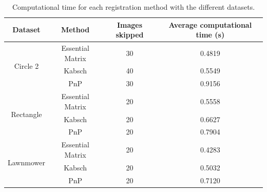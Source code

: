 \documentclass[12pt,a4paper]{article}
\begin{document}
    \begin{table}[t!]
      \centering{}
      \hspace*{-1.5cm}\begin{tabular}{|c|c|c|c|}
      \hline
      \textbf{Dataset} &\textbf{Method}  & \textbf{Images skipped} & {\textbf{Average computational time (s)}} \\ 
      \hline
      \multirow{3}{*}{Circle 2} & Essential Matrix & 30 & 0.4819 \\
                                \cline{2-4}
                                & Kabsch & 40 & 0.5549 \\
                                \cline{2-4}
                                & PnP & 30 & 0.9156 \\
      \hline
      \multirow{3}{*}{Rectangle} & Essential Matrix & 20 & 0.5558 \\
                                \cline{2-4}
                                & Kabsch & 20 & 0.6627 \\
                                \cline{2-4}
                                & PnP & 20 & 0.7904 \\
      \hline
      \multirow{3}{*}{Lawnmower} & Essential Matrix & 20 & 0.4283 \\
                                \cline{2-4}
                                & Kabsch & 20 & 0.5032 \\
                                \cline{2-4}
                                & PnP & 20 & 0.7120 \\
      \hline
      \end{tabular}\hspace*{-1.5cm}
      \caption{Computational time for each registration method with the different datasets.}
      \label{t: res multi time}
    \end{table}  
\end{document}
